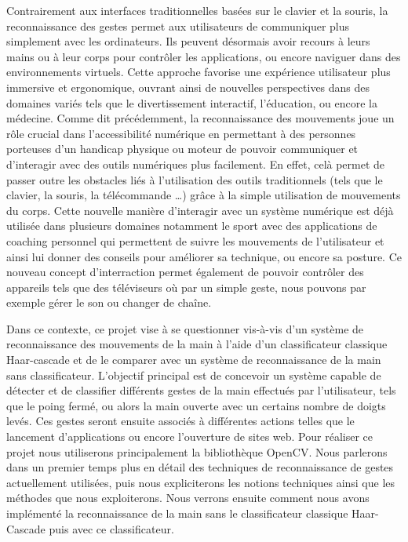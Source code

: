 \documentclass[11pt]{article}
\begin{document}
Contrairement aux interfaces traditionnelles basées sur le clavier et la souris, la reconnaissance des gestes permet aux utilisateurs de communiquer plus simplement avec les ordinateurs. Ils peuvent désormais avoir recours à leurs mains ou à leur corps pour contrôler les applications, ou encore naviguer dans des environnements virtuels. Cette approche favorise une expérience utilisateur plus immersive et ergonomique, ouvrant ainsi de nouvelles perspectives dans des domaines variés tels que le divertissement interactif, l'éducation, ou encore la médecine. Comme dit précédemment, la reconnaissance des mouvements joue un rôle crucial dans l’accessibilité numérique en permettant à des personnes porteuses d'un handicap physique  ou moteur de pouvoir communiquer et d'interagir avec des outils numériques plus facilement. En effet, celà permet de passer outre les obstacles liés à l’utilisation des outils traditionnels (tels que le clavier, la souris, la télécommande …) grâce à la simple utilisation de mouvements du corps. Cette nouvelle manière d'interagir avec un système numérique est déjà utilisée dans plusieurs domaines notamment le sport avec des applications de coaching personnel qui permettent de suivre les mouvements de l'utilisateur et ainsi lui donner des conseils pour améliorer sa technique, ou encore sa posture. Ce nouveau concept d'interraction permet également de pouvoir contrôler des appareils tels que des téléviseurs où par un simple geste, nous pouvons par exemple gérer le son ou changer de chaîne. \bigbreak

Dans ce contexte, ce projet vise à se questionner vis-à-vis d'un système de reconnaissance des mouvements de la main à l’aide d’un classificateur classique Haar-cascade et de le comparer avec un système de reconnaissance de la main sans classificateur.
L'objectif principal est de concevoir un système capable de détecter et de classifier différents gestes de la main effectués par l'utilisateur,
tels que le poing fermé, ou alors la main ouverte avec un certains nombre de doigts levés. Ces gestes seront ensuite associés à différentes
actions telles que le lancement d'applications ou encore l'ouverture de sites web.
Pour réaliser ce projet nous utiliserons principalement la bibliothèque OpenCV. Nous parlerons dans un premier temps plus en détail des techniques de reconnaissance de gestes actuellement utilisées, puis nous expliciterons les notions techniques ainsi que les méthodes que nous exploiterons. Nous verrons ensuite comment nous avons implémenté la reconnaissance de la main sans le classificateur classique Haar-Cascade puis avec ce classificateur.
\end{document}
